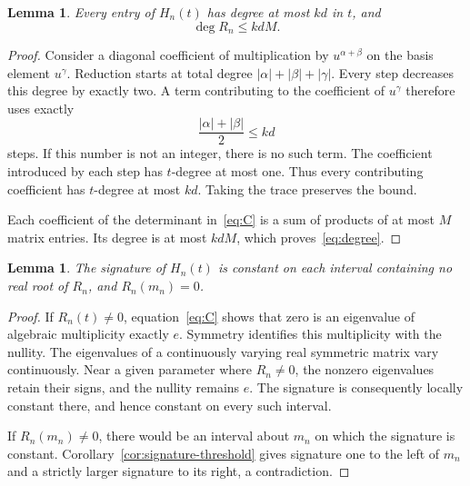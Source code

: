 \documentclass[11pt,leqno]{amsart}
\newtheorem{lemma}[theorem]{Lemma}
\theoremstyle{definition}
\theoremstyle{remark}
\numberwithin{equation}{section}
\newcommand{\abs}[1]{\lvert #1\rvert}
\begin{document}
\begin{lemma}\label{lem:degree}
Every entry of $H_n(t)$ has degree at most $kd$ in $t$, and
\begin{equation}\label{eq:degree}
 \deg R_n\leq kdM.
\end{equation}
\end{lemma}

\begin{proof}
Consider a diagonal coefficient of multiplication by $u^{\alpha+\beta}$
on the basis element $u^\gamma$. Reduction starts at total degree
$\abs{\alpha}+\abs{\beta}+\abs{\gamma}$. Every step decreases this
degree by exactly two. A term contributing to the coefficient of
$u^\gamma$ therefore uses exactly
\[
 \frac{\abs{\alpha}+\abs{\beta}}{2}\leq kd
\]
steps. If this number is not an integer, there is no such term.
The coefficient introduced by each step has $t$-degree at most one.
Thus every contributing coefficient has $t$-degree at most $kd$.
Taking the trace preserves the bound.

Each coefficient of the determinant in~\eqref{eq:C} is a sum of
products of at most $M$ matrix entries. Its degree is at most $kdM$,
which proves~\eqref{eq:degree}.
\end{proof}

\begin{lemma}\label{lem:boundary}
The signature of $H_n(t)$ is constant on each interval containing no
real root of $R_n$, and $R_n(m_n)=0$.
\end{lemma}

\begin{proof}
If $R_n(t)\ne0$, equation~\eqref{eq:C} shows that zero is an eigenvalue
of algebraic multiplicity exactly $e$. Symmetry identifies this
multiplicity with the nullity. The eigenvalues of a continuously varying
real symmetric matrix vary continuously. Near a given parameter where
$R_n\ne0$, the nonzero eigenvalues retain their signs, and the nullity
remains $e$. The signature is consequently locally constant there,
and hence constant on every such interval.

If $R_n(m_n)\ne0$, there would be an interval about $m_n$ on which the
signature is constant. Corollary~\ref{cor:signature-threshold} gives
signature one to the left of $m_n$ and a strictly larger signature to
its right, a contradiction.
\end{proof}
\end{document}
